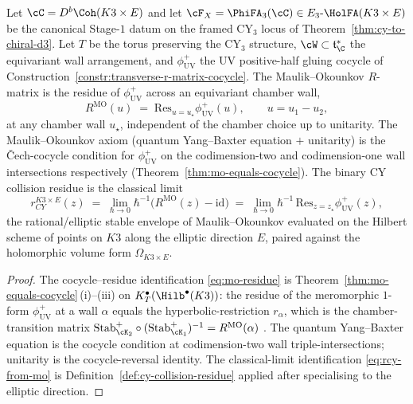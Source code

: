 \begin{theorem}
\label{thm:face4-mo-cocycle-residue}
Let $\cC = D^b\Coh(K3 \times E)$ and let $\cF_X = \PhiFA_3(\cC) \in
E_3\text{-}\HolFA(K3 \times E)$ be the canonical Stage-$1$ datum on
the framed CY$_3$ locus of Theorem~\ref{thm:cy-to-chiral-d3}. Let $T$
be the torus preserving the CY$_3$ structure, $\cW \subset
\mathfrak{t}^*_\C$ the equivariant wall arrangement, and
$\phi^+_{\mathrm{UV}}$ the UV positive-half gluing cocycle of
Construction~\ref{constr:transverse-r-matrix-cocycle}. The
Maulik--Okounkov $R$-matrix is the residue of $\phi^+_{\mathrm{UV}}$
across an equivariant chamber wall,
\begin{equation}
\label{eq:mo-residue}
 R^{\mathrm{MO}}(u) \;=\; \mathrm{Res}_{u = u_\star}
 \phi^+_{\mathrm{UV}}(u),
 \qquad u = u_1 - u_2,
\end{equation}
at any chamber wall $u_\star$, independent of the chamber choice up
to unitarity. The Maulik--Okounkov axiom \textup{(}quantum
Yang--Baxter equation $+$ unitarity\textup{)} is the
\v{C}ech-cocycle condition for $\phi^+_{\mathrm{UV}}$ on the
codimension-two and codimension-one wall intersections respectively
\textup{(}Theorem~\ref{thm:mo-equals-cocycle}\textup{)}. The binary
CY collision residue is the classical limit
\begin{equation}
\label{eq:rcy-from-mo}
 r_{CY}^{K3 \times E}(z) \;=\;
 \lim_{\hbar \to 0} \hbar^{-1}\bigl(R^{\mathrm{MO}}(z) - \mathrm{id}\bigr)
 \;=\;
 \lim_{\hbar \to 0} \hbar^{-1}\,\mathrm{Res}_{z = z_\star}
 \phi^+_{\mathrm{UV}}(z),
\end{equation}
the rational/elliptic stable envelope of Maulik--Okounkov evaluated
on the Hilbert scheme of points on $K3$ along the elliptic direction
$E$, paired against the holomorphic volume form $\Omega_{K3 \times E}$.
\end{theorem}

\begin{proof}
The cocycle--residue identification \eqref{eq:mo-residue} is
Theorem~\ref{thm:mo-equals-cocycle}\,(i)--(iii) on
$K^\bullet_T(\Hilb^\bullet(K3))$: the residue of the meromorphic
$1$-form $\phi^+_{\mathrm{UV}}$ at a wall $\alpha$ equals the
hyperbolic-restriction $r_\alpha$, which is the chamber-transition
matrix
$\mathrm{Stab}_{\cK_2}^+ \circ (\mathrm{Stab}_{\cK_1}^+)^{-1} =
R^{\mathrm{MO}}(\alpha)$ \cite[Theorem~$4.6.1$]{MaulikOkounkov2012}.
The quantum Yang--Baxter equation is the cocycle condition at
codimension-two wall triple-intersections; unitarity is the
cocycle-reversal identity. The classical-limit identification
\eqref{eq:rcy-from-mo} is Definition~\ref{def:cy-collision-residue}
applied after specialising to the elliptic direction.
\end{proof}

